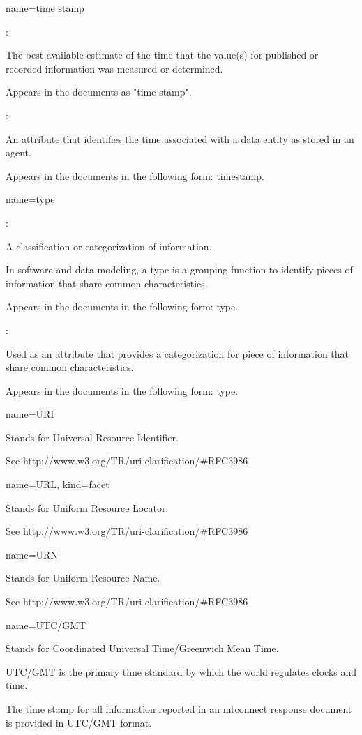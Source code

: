 {
  name={time stamp}
}
{
	:

	The best available estimate of the time that the value(s) for published or recorded information was measured or determined.

	Appears in the documents as "time stamp".

	:

	An attribute that identifies the time associated with a \gls{data entity} as stored in an \gls{agent}.

	Appears in the documents in the following form: \gls{timestamp}.
}


{
  name={type}
}
{
	:

	A classification or categorization of information.

	In software and data modeling, a type is a grouping function to identify pieces of information that share common characteristics. 

	Appears in the documents in the following form: type.

	:

	Used as an attribute that provides a categorization for piece of information that share common characteristics.

	Appears in the documents in the following form: \gls{type}.
}


{
  name={URI}
}
{
	Stands for Universal Resource Identifier.  

	See http://www.w3.org/TR/uri-clarification/\#RFC3986  
}


{
  name={URL},
  kind={facet}
}
{
	Stands for Uniform Resource Locator.  

	See http://www.w3.org/TR/uri-clarification/\#RFC3986
}


{
  name={URN}
}
{
	Stands for Uniform Resource Name.  

	See http://www.w3.org/TR/uri-clarification/\#RFC3986  
}


{
  name={UTC/GMT}
}
{
	Stands for Coordinated Universal Time/Greenwich Mean Time.  

	UTC/GMT is the primary time standard by which the world regulates clocks and time.

	The time stamp for all information reported in an \gls{mtconnect response document} is provided in UTC/GMT format.
}


